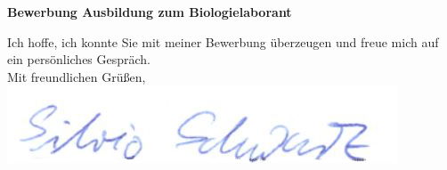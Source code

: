 \documentclass[11pt,a4paper,roman]{moderncv}
\begin{document}
\recipient{~}{ }
\date{\today}
\opening{\textbf{Bewerbung Ausbildung zum Biologielaborant}}
\closing{Ich hoffe, ich konnte Sie mit meiner Bewerbung überzeugen und freue mich auf ein persönliches Gespräch.\\
\vspace{1cm}
Mit freundlichen Grüßen,\\ \vspace{0.2cm}
\includegraphics[scale=0.4]{../../img/Unterschrift_Silvio} \vspace{-1cm}
}
\makelettertitle
\end{document}
